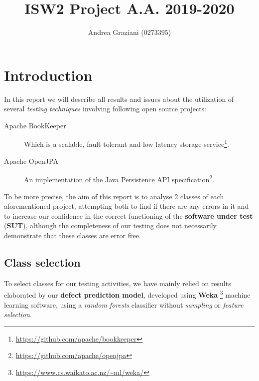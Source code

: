 \documentclass[sigconf]{acmart}
\begin{document}
\title{ISW2 Project A.A. 2019-2020}

\author{Andrea Graziani ($0273395$)}

\maketitle

\section{Introduction}

In this report we will describe all results and issues about the utilization of several \textit{testing techniques} involving following open source projects:

\begin{description}
\item[Apache BookKeeper\texttrademark]Which is a scalable, fault tolerant and low latency storage service\footnote{\url{https://github.com/apache/bookkeeper}}.
\item[Apache OpenJPA\texttrademark]An implementation of the Java Persistence API specification\footnote{\url{https://github.com/apache/openjpa}}. 
\end{description}

To be more precise, the aim of this report is to analyse $2$ classes of each aforementioned project, attempting both to find if there are any errors in it and to increase our confidence in the correct functioning of the \textbf{software under test} (\textbf{SUT}), although the completeness of our testing does not necessarily demonstrate that these classes are error free.

\subsection{Class selection}

To select classes for our testing activities, we have mainly relied on results elaborated by our \textbf{defect prediction model}, developed using \textbf{Weka} \footnote{\url{https://www.cs.waikato.ac.nz/~ml/weka/}} machine learning software, using a \textit{random forests} classifier without \textit{sampling} or \textit{feature selection}. 
\end{document}
